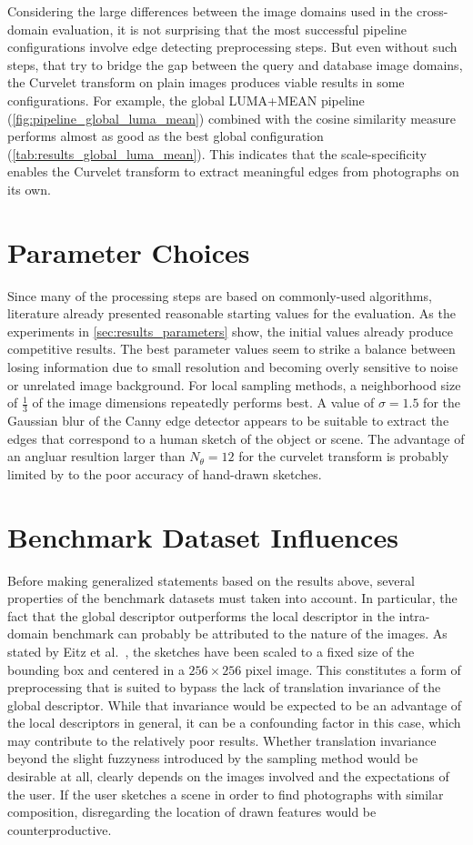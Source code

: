 Considering the large differences between the image domains used in the
cross-domain evaluation, it is not surprising that the most successful pipeline
configurations involve edge detecting preprocessing steps. But even without
such steps, that try to bridge the gap between the query and database image
domains, the Curvelet transform on plain images produces viable results in some
configurations. For example, the global LUMA+MEAN pipeline
(\autoref{fig:pipeline_global_luma_mean}) combined with the cosine
similarity measure performs almost as good as the best global configuration
(\autoref{tab:results_global_luma_mean}). This indicates that the
scale-specificity enables the Curvelet transform to extract meaningful edges
from photographs on its own.

\section{Parameter Choices}

Since many of the processing steps are based on commonly-used algorithms,
literature already presented reasonable starting values for the evaluation. As
the experiments in \autoref{sec:results_parameters} show, the initial
values already produce competitive results. The best parameter values seem to
strike a balance between losing information due to small resolution and
becoming overly sensitive to noise or unrelated image background. For local
sampling methods, a neighborhood size of $\frac{1}{3}$ of the image dimensions
repeatedly performs best. A value of $\sigma=1.5$ for the Gaussian blur of the
Canny edge detector appears to be suitable to extract the edges that correspond
to a human sketch of the object or scene. The advantage of an angluar resultion
larger than $N_{\theta}=12$ for the curvelet transform is probably limited by
to the poor accuracy of hand-drawn sketches.

\section{Benchmark Dataset Influences}

Before making generalized statements based on the results above, several
properties of the benchmark datasets must taken into account. In particular,
the fact that the global descriptor outperforms the local descriptor in the
intra-domain benchmark can probably be attributed to the nature of the images.
As stated by Eitz et al.\ \autocite{eitz_how_2012}, the sketches have been
scaled to a fixed size of the bounding box and centered in a $256 \times 256$
pixel image. This constitutes a form of preprocessing that is suited to bypass
the lack of translation invariance of the global descriptor. While that
invariance would be expected to be an advantage of the local descriptors in
general, it can be a confounding factor in this case, which may contribute to
the relatively poor results. Whether translation invariance beyond the
slight fuzzyness introduced by the sampling method would be desirable at all,
clearly depends on the images involved and the expectations of the user. If the
user sketches a scene in order to find photographs with similar composition,
disregarding the location of drawn features would be counterproductive.

